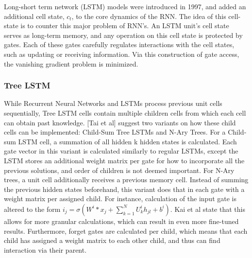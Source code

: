 Long-short term network (LSTM) models \cite{hochreiter1997long} were introduced
in 1997, and added an additional cell state, $c_t$, to the core dynamics of the
RNN. The idea of this cell-state is to counter this major problem of RNN's. An
LSTM unit's cell state serves as long-term memory, and any operation on this
cell state is protected by gates. Each of these gates carefully regulates
interactions with the cell states, such as updating or receiving information.
Via this construction of gate access, the vanishing gradient problem is
minimized.
\subsubsection{Tree LSTM}
While Recurrent Neural Networks and LSTMs process previous unit cells
sequentially, Tree LSTM cells \cite{DBLP:journals/corr/TaiSM15}
\cite{DBLP:journals/corr/ZhuSG15} \cite{DBLP:journals/corr/LeZ15} contain
multiple children cells from which each cell can obtain past knowledge. [Tai et
al] suggest two variants on how these child cells can be implemented: Child-Sum
Tree LSTMs and N-Ary Trees. For a Child-sum LSTM cell, a summation of all hidden
k hidden states is calculated. Each gate vector in this variant is calculated
similarly to regular LSTMs, except the LSTM stores an additional weight matrix
per gate for how to incorporate all the previous solutions, and order of
children is not deemed important. For N-Ary trees, a unit cell additionally
receives a previous memory cell. Instead of summing the previous hidden states
beforehand, this variant does that in each gate with a weight matrix per
assigned child. For instance, calculation of the input gate is altered to the
form $i_j=\sigma(W^i*x_j + \sum\limits_{k=1}^{N}U_k^{i}h_{jl}+b^i)$. Kai et al
state that this allows for more granular calculations, which can result in even
more fine-tuned results. Furthermore, forget gates are calculated per child,
which means that each child has assigned a weight matrix to each other child,
and thus can find interaction via their parent. 